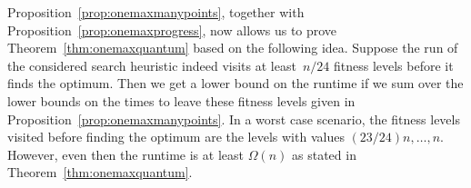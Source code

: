 \documentclass[a4paper,11pt]{article}
\begin{document}
Proposition~\ref{prop:onemaxmanypoints}, together with Proposition~\ref{prop:onemaxprogress}, now allows us to prove Theorem~\ref{thm:onemaxquantum} based on the following idea. Suppose the run of the considered search heuristic indeed visits at least~$n/24$ fitness levels before it finds the optimum. Then we get a lower bound on the runtime if we sum over the lower bounds on the times to leave these fitness levels given in Proposition~\ref{prop:onemaxmanypoints}. In a worst case scenario, the fitness levels visited before finding the optimum are the levels with values $(23/24)n,\dots,n$. However, even then the runtime is at least $\Omega(n)$ as stated in Theorem~\ref{thm:onemaxquantum}.

\end{document}

